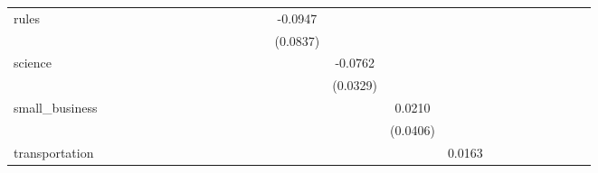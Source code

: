 \begin{tabular}{l*{25}{c}}
rules               &            &            &            &            &            &            &            &            &            &            &            &            &            &     -0.0947&            &            &            &            &            &            &            &            &            &            &            \\
                    &            &            &            &            &            &            &            &            &            &            &            &            &            &    (0.0837)&            &            &            &            &            &            &            &            &            &            &            \\
science             &            &            &            &            &            &            &            &            &            &            &            &            &            &            &     -0.0762&            &            &            &            &            &            &            &            &            &            \\
                    &            &            &            &            &            &            &            &            &            &            &            &            &            &            &    (0.0329)&            &            &            &            &            &            &            &            &            &            \\
small\_business      &            &            &            &            &            &            &            &            &            &            &            &            &            &            &            &      0.0210&            &            &            &            &            &            &            &            &            \\
                    &            &            &            &            &            &            &            &            &            &            &            &            &            &            &            &    (0.0406)&            &            &            &            &            &            &            &            &            \\
transportation      &            &            &            &            &            &            &            &            &            &            &            &            &            &            &            &            &      0.0163&            &            &            &            &            &            &            &            \\

\end{tabular}
